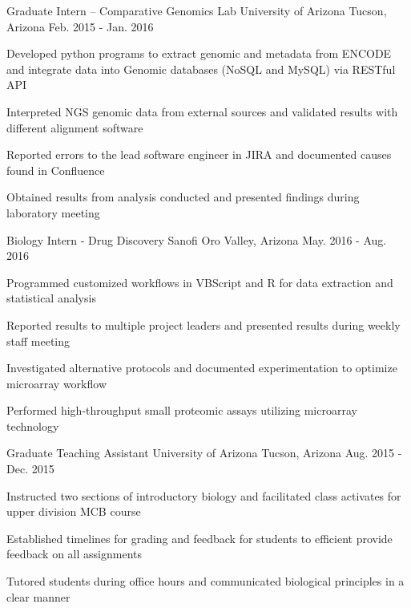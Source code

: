 \begin{cventries}
  \cventry
  {Graduate Intern – Comparative Genomics Lab} %
  {University of Arizona} %
  {Tucson, Arizona} %
  {Feb. 2015 - Jan. 2016} %
  {
    \begin{cvitems} %
      \item{Developed python programs to extract genomic and metadata from ENCODE and integrate data into Genomic databases (NoSQL and MySQL) via RESTful API}
      \item{Interpreted NGS genomic data from external sources and validated results with different alignment software}
      \item{Reported errors to the lead software engineer in JIRA and documented causes found in Confluence}
      \item{Obtained results from analysis conducted and presented findings during laboratory meeting}
    \end{cvitems}
  }

  \cventry
  {Biology Intern - Drug Discovery} %
  {Sanofi} %
  {Oro Valley, Arizona} %
  {May. 2016 - Aug. 2016} %
  {
    \begin{cvitems} %
      \item{Programmed customized workflows in VBScript and R for data extraction and statistical analysis}
      \item{Reported results to multiple project leaders and presented results during weekly staff meeting}
      \item{Investigated alternative protocols and documented experimentation to optimize microarray workflow}
      \item{Performed high-throughput small proteomic assays utilizing  microarray technology}
    \end{cvitems}
  }

  \cventry
  {Graduate Teaching Assistant} %
  {University of Arizona} %
  {Tucson, Arizona} %
  {Aug. 2015 - Dec. 2015} %
  {
    \begin{cvitems} %
      \item{Instructed two sections of introductory biology and facilitated class activates for upper division MCB course}
      \item{Established timelines for grading and feedback for students to efficient provide feedback on all assignments}
      \item{Tutored students during office hours and communicated biological principles in a clear manner}
    \end{cvitems}
  }


\end{cventries}
